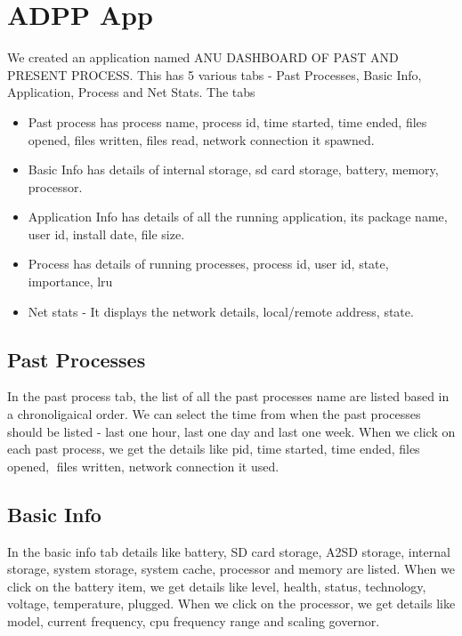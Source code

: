 \section{ADPP App}\label{apkcreated}

We created an application named ANU DASHBOARD OF PAST AND PRESENT
PROCESS. This has 5 various tabs - Past Processes, Basic Info,
Application, Process and Net Stats.  The tabs

\begin{itemize}
\item Past process has process name, process id, time started,
  time ended, files opened, files written, files read, network
  connection it spawned.
\item Basic Info has details of internal storage, sd card storage, battery, memory, processor.
\item Application Info has details of all the running application, its
  package name, user id, install date, file size.
\item Process has details of running processes, process id, user id,
  state, importance, lru
\item Net stats - It displays the network details, local/remote
  address, state.
\end{itemize}

\subsection{Past Processes}

In the past process tab, the list of all the past processes name are
listed based in a chronoligaical order. We can select the time from
when the past processes should be listed - last one hour, last one day
and last one week.  When we click on each past process, we get the
details like pid, time started, time ended, files opened, files
written, network connection it used.

\subsection{Basic Info}
In the basic info tab details like battery, SD card storage, A2SD
storage, internal storage, system storage, system cache, processor and
memory are listed.  When we click on the battery item, we get details
like level, health, status, technology, voltage, temperature, plugged.
When we click on the processor, we get details like model, current
frequency, cpu frequency range and scaling governor.

